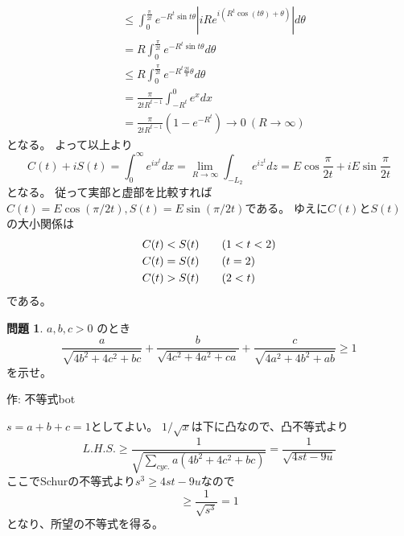 \documentclass[uplatex, a5paper]{jsarticle}
\makeatletter
\theoremstyle{definition}
\newtheorem{prob}{問題}
\renewenvironment{proof}[1][\proofname]{
  \pushQED{\qed}%
  \normalfont \topsep6\p@\@plus6\p@\relax
  \trivlist
  \item[\hskip\labelsep
    #1\@addpunct{\textbf{.}}]\ignorespaces
}{%
  \popQED\endtrivlist\@endpefalse
}
\providecommand{\proofname}{証明}
\newcommand{\lhs }{ L.H.S. }
\def\qed{\hfill $\Box$}
\makeatother
\begin{document}
\begin{proof}
\begin{align*}
    &\leq \int_0^{\frac{\pi}{2t}} e^{-R^t\sin t\theta}
    \left| iR e^{i \left( R^t\cos (t\theta ) + \theta \right) } \right| d\theta \\
    &= R \int_0^{\frac{\pi}{2t}} e^{-R^t\sin t\theta} d\theta \\
    &\leq  R \int_0^{\frac{\pi}{2t}} e^{-R^t\frac{2t}{\pi}\theta } d\theta \\
    &= \frac{\pi}{2tR^{t-1}} \int_{-R^t}^0 e^x dx \\
    &= \frac{\pi}{2tR^{t-1}} \left( 1-e^{-R^t} \right)  \to 0 \ ( R\to \infty )
  \end{align*}
  となる。
  よって以上より
  \[
  C(t) + iS(t)
  = \int_0^\infty e^{ix^t} dx
  = \lim_{R \to \infty} \int_{-L_2} e^{iz^t} dz
  = E\cos \frac{\pi}{2t} + i E \sin \frac{\pi}{2t}
  \]
  となる。
  従って実部と虚部を比較すれば\(C(t)=E\cos (\pi / 2t) , S(t) = E \sin (\pi /2t) \)である。
  ゆえに\(C(t)\)と\(S(t)\)の大小関係は
  \begin{alignat*}{2}
    &C(t) < S(t) & \quad & ( 1 < t < 2 )  \notag \\
    &C(t) = S(t) &       & ( t = 2 )      \notag \\
    &C(t) > S(t) &       & ( 2 < t )      \notag
  \end{alignat*}
  である。
\end{proof}










\newpage


\begin{prob}
  \(a,b,c>0\)
  のとき
  \[
  \frac{a}{\sqrt{4b^2 + 4c^2 + bc}} + \frac{b}{\sqrt{4c^2+4a^2+ca}} + \frac{c}{\sqrt{4a^2+4b^2+ab}} \geq 1
  \]
  を示せ。
  \begin{flushright}
    作: 不等式bot
  \end{flushright}
\end{prob}


\begin{proof}
  \(s=a+b+c=1\)としてよい。
  \(1/\sqrt{x}\)は下に凸なので、凸不等式より
  \[
  \lhs \geq \frac{1}{ \sqrt{ \sum_{cyc.} a(4b^2+4c^2 +bc) }} = \frac{1}{\sqrt{4st-9u}}
  \]
  ここでSchurの不等式より\(s^3 \geq 4st -9u\)なので
  \[
  \geq \frac{1}{\sqrt{s^3}} = 1
  \]
  となり、所望の不等式を得る。
\end{proof}
\end{document}
